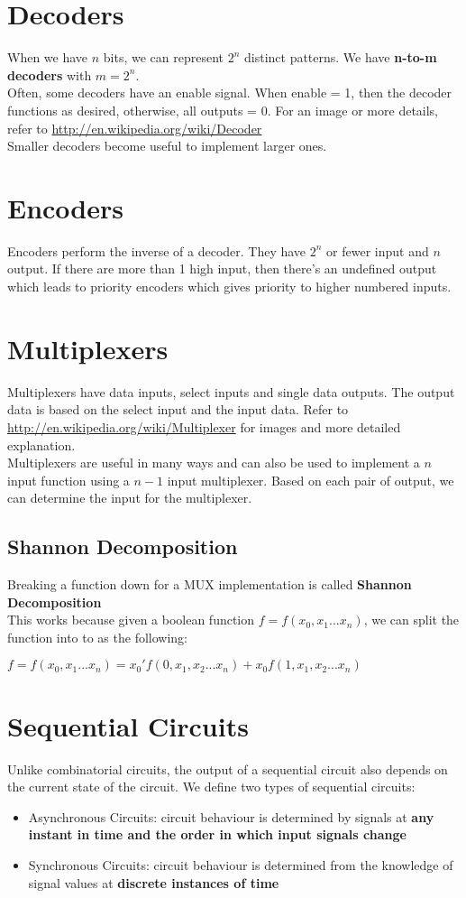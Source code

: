 \documentclass[12pt]{report}
\begin{document}
	\section{Decoders}
		When we have $n$ bits, we can represent $2^n$ distinct patterns. We have \textbf{n-to-m decoders} with $m = 2^n$.\\
		Often, some decoders have an enable signal. When enable = 1, then the decoder functions as desired, otherwise, all outputs = 0. For an image or more details, refer to \url{http://en.wikipedia.org/wiki/Decoder}\\
		Smaller decoders become useful to implement larger ones.
	\section{Encoders}
	 	Encoders perform the inverse of a decoder. They have $2^n$ or fewer input and $n$ output. If there are more than 1 high input, then there's an undefined output which leads to priority encoders which gives priority to higher numbered inputs.
	 \section{Multiplexers}
	 	Multiplexers have data inputs, select inputs and single data outputs. The output data is based on the select input and the input data. Refer to \url{http://en.wikipedia.org/wiki/Multiplexer} for images and more detailed explanation.\\
	 	Multiplexers are useful in many ways and can also be used to implement a $n$ input function using a $n-1$ input multiplexer. Based on each pair of output, we can determine the input for the multiplexer. 
	 	\subsection{Shannon Decomposition}
	 		Breaking a function down for a MUX implementation is called \textbf{Shannon Decomposition}\\
	 		This works because given a boolean function $f = f(x_0, x_1...x_n)$, we can split the function into to as the following:\\
	 		\centerline{$f = f(x_0, x_1...x_n) = x_0'f(0, x_1, x_2 ... x_n) + x_0f(1, x_1, x_2...x_n)$}
	 \section{Sequential Circuits}
	 	Unlike combinatorial circuits, the output of a sequential circuit also depends on the current state of the circuit. We define two types of sequential circuits:
	 	\begin{itemize}
		 	\item Asynchronous Circuits: circuit behaviour is determined by signals at \textbf{any instant in time and the order in which input signals change}
		 	\item Synchronous Circuits: circuit behaviour is determined from the knowledge of signal values at \textbf{discrete instances of time}
	 	\end{itemize}
\end{document}
